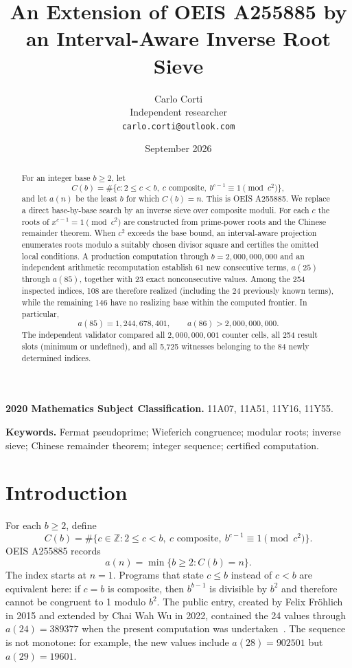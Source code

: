 \documentclass[11pt]{article}
\title{An Extension of OEIS A255885 by an Interval-Aware Inverse Root Sieve}
\author{Carlo Corti\\
Independent researcher\\
\texttt{carlo.corti@outlook.com}}
\date{September 2026}
\newcommand{\Z}{\mathbb{Z}}
\begin{document}
\maketitle

\begin{abstract}
For an integer base $b\geq 2$, let
\[
 C(b)=\#\{c:2\leq c<b,\ c\text{ composite},\ b^{c-1}\equiv1\pmod{c^2}\},
\]
and let $a(n)$ be the least $b$ for which $C(b)=n$.  This is OEIS
A255885.  We replace a direct base-by-base search by an inverse sieve over
composite moduli.  For each $c$ the roots of $x^{c-1}=1\pmod{c^2}$ are
constructed from prime-power roots and the Chinese remainder theorem.  When
$c^2$ exceeds the base bound, an interval-aware projection enumerates roots
modulo a suitably chosen divisor square and certifies the omitted local
conditions.  A production computation through $b=2{,}000{,}000{,}000$ and an
independent arithmetic recomputation establish 61 new consecutive terms,
$a(25)$ through $a(85)$, together with 23 exact nonconsecutive values.  Among
the 254 inspected indices, 108 are therefore realized (including the 24
previously known terms), while the remaining 146 have no realizing base
within the computed frontier.  In particular,
\[
 a(85)=1{,}244{,}678{,}401,
 \qquad a(86)>2{,}000{,}000{,}000.
\]
The independent validator compared all $2{,}000{,}000{,}001$ counter cells,
all 254 result slots (minimum or undefined), and all 5,725 witnesses belonging
to the 84 newly determined indices.
\end{abstract}

\noindent\textbf{2020 Mathematics Subject Classification.}
11A07, 11A51, 11Y16, 11Y55.

\noindent\textbf{Keywords.}
Fermat pseudoprime; Wieferich congruence; modular roots; inverse sieve;
Chinese remainder theorem; integer sequence; certified computation.

\section{Introduction}

For each $b\geq2$, define
\begin{equation}\label{eq:C-definition}
 C(b)=\#\{c\in\Z:2\leq c<b,\ c\text{ composite},\
 b^{c-1}\equiv1\pmod{c^2}\}.
\end{equation}
OEIS A255885 records
\begin{equation}\label{eq:a-definition}
 a(n)=\min\{b\geq2:C(b)=n\}.
\end{equation}
The index starts at $n=1$.  Programs that state $c\leq b$ instead of $c<b$
are equivalent here: if $c=b$ is composite, then $b^{b-1}$ is divisible by
$b^2$ and therefore cannot be congruent to 1 modulo $b^2$.
The public entry, created by Felix Fr\"ohlich in 2015 and extended by Chai
Wah Wu in 2022, contained the 24 values through $a(24)=389377$ when the
present computation was undertaken~\cite{oeis-a255885}.  The sequence is not
monotone: for example, the new values include $a(28)=902501$ but
$a(29)=19601$.
\end{document}
